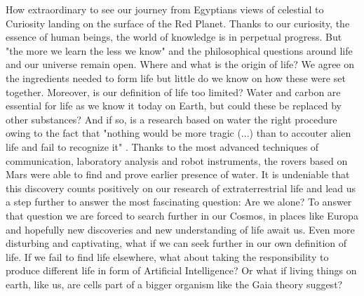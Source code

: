 How extraordinary to see our journey from Egyptians views of celestial to Curiosity landing on the surface of the Red Planet. 
Thanks to our curiosity, the essence of human beings, the world of knowledge is in perpetual progress. 
But "the more we learn the less we know" and the philosophical questions around life and our universe remain open. 
Where and what is the origin of life? 
We agree on the ingredients needed to form life but little do we know on how these were set together. 
Moreover, is our definition of life too limited? 
Water and carbon are essential for life as we know it today on Earth, but could these be replaced by other substances? 
And if so, is a research based on water the right procedure owing to the fact that "nothing would be more tragic (...) than to accouter alien life and fail to recognize it" \cite{OForm3}. 
Thanks to the most advanced techniques of communication, laboratory analysis and robot instruments, the rovers based on Mars were able to find and prove earlier presence of water.
It is undeniable that this discovery counts positively on our research of extraterrestrial life and lead us a step further to answer the most fascinating question:  Are we alone? 
To answer that question we are forced to search further in our Cosmos, in places like Europa and hopefully new discoveries and new understanding of life await us. 
Even more disturbing and captivating, what if we can seek further in our own definition of life. 
If we fail to find life elsewhere, what about taking the responsibility to produce different life in form of Artificial Intelligence? 
Or what if living things on earth, like us, are cells part of a bigger organism like the Gaia theory suggest?